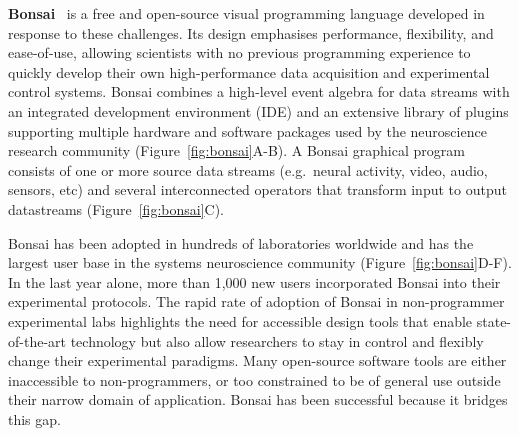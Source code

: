 \textbf{Bonsai}~\citep{lopesEtAl15,lopesAndMonteiro21} is a free and open-source visual programming language developed 
in response to these challenges.
Its design emphasises performance, flexibility, and ease-of-use,
allowing scientists with no previous programming experience to quickly develop
their own high-performance data acquisition and experimental control systems.
Bonsai combines a high-level event algebra for data streams with an integrated
development environment (IDE) and an extensive library of plugins supporting
multiple hardware and software packages used by the neuroscience research
community (Figure~\ref{fig:bonsai}A-B).
%
A Bonsai graphical program consists of one or more source data streams (e.g.\ neural activity, video, audio, sensors, etc)
and several interconnected operators that transform input to output
datastreams (Figure~\ref{fig:bonsai}C).

%



Bonsai has been adopted in hundreds of laboratories worldwide and has the largest user base in the systems neuroscience community (Figure~\ref{fig:bonsai}D-F).  In the last year alone, more than 1,000 new users incorporated Bonsai into their experimental protocols. The rapid rate of adoption of Bonsai in non-programmer experimental
labs highlights the need for accessible design tools that enable
state-of-the-art technology but also allow researchers to stay in control and flexibly
change their experimental paradigms.  Many open-source software tools are
either inaccessible to non-programmers, or too constrained to be of general use
outside their narrow domain of application. Bonsai has been successful because
it bridges this gap.

